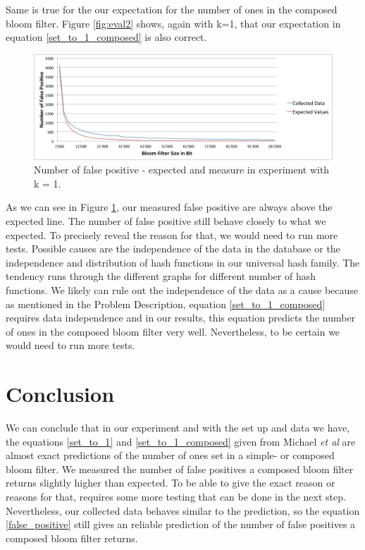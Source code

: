 \documentclass[12]{scrartcl}
\begin{document}
Same is true for the our expectation for the number of ones in the composed bloom filter. Figure \ref{fig:eval2} shows, again with k=1, that our expectation in equation \ref{set_to_1_composed} is also correct.
\begin{figure}[H]
	\begin{center}
		\includegraphics[scale=0.4]{res/1-fp.png}
	\end{center}
	\caption{Number of false positive - expected and measure in experiment with k = 1.}
	\label{fig:eval3}
\end{figure}
As we can see in Figure \ref{fig:eval3}, our measured false positive are always above the expected line. The number of false positive still behave closely to what we expected. To precisely reveal the reason for that, we would need to run more tests. Possible causes are the independence of the data in the database or the independence and distribution of hash functions in our universal hash family. The tendency runs through the different graphs for different number of hash functions. We likely can rule out the independence of the data as a cause because as mentioned in the Problem Description, equation \ref{set_to_1_composed} requires data independence and in our results, this equation predicts the number of ones in the composed bloom filter very well. Nevertheless, to be certain we would need to run more tests.


\section{Conclusion}
We can conclude that in our experiment and with the set up and data we have, the equations \ref{set_to_1} and \ref{set_to_1_composed} given from Michael {\em et al}\cite{michael} are almost exact predictions of the number of ones set in a simple- or composed bloom filter. We measured the number of false positives a composed bloom filter returns slightly higher than expected. To be able to give the exact reason or reasons for that, requires some more testing that can be done in the next step. Nevertheless, our collected data behaves similar to the prediction, so the equation \ref{false_positive} still gives an reliable prediction of the number of false positives a composed bloom filter returns.
\end{document}
